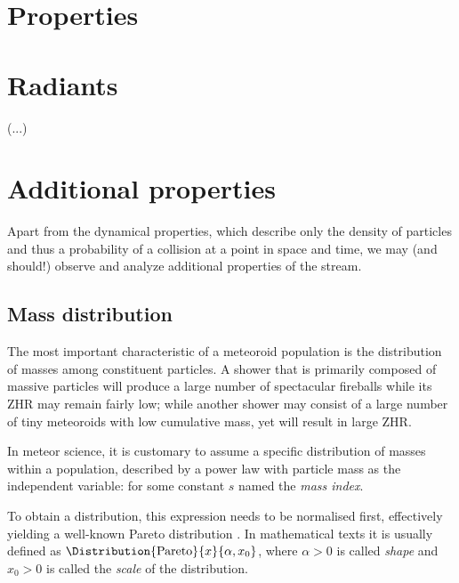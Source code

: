 \section{Properties} \label{mp}
    \section{Radiants} \label{mpr}
        (...)

    \section{}

    \section{Additional properties} \label{mpa}
        Apart from the dynamical properties, which describe only the density of particles
        and thus a probability of a collision at a point in space and time,
        we may (and should!) observe and analyze additional properties of the stream.

        \subsection{Mass distribution} \label{mpam}
            The most important characteristic of a meteoroid population is the distribution of masses
            among constituent particles. A shower that is primarily composed of massive particles
            will produce a large number of spectacular fireballs while its ZHR may remain fairly low;
            while another shower may consist of a large number of tiny meteoroids with low cumulative mass,
            yet will result in large ZHR.

            In meteor science, it is customary to assume a specific distribution of masses within a population,
            described by a power law with particle mass as the independent variable:
            for some constant $s$ named the \emph{mass index}.

            To obtain a distribution, this expression needs to be normalised first,
            effectively yielding a well-known Pareto distribution \citep{arnold1983}.
            In mathematical texts it is usually defined as $\Distribution{\mathrm{Pareto}}{x}{\alpha, x_0}$,
            where $\alpha > 0$ is called \emph{shape} and $x_0 > 0$ is called the \emph{scale} of the distribution.


